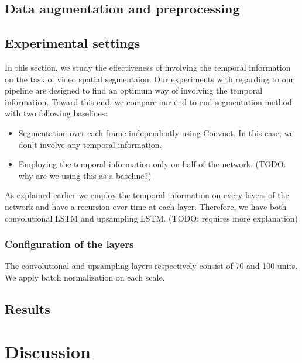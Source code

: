 \subsection{Data augmentation and preprocessing}

\subsection{Experimental settings}\label{sec:deconvLSTM_settings}
In this section, we study the effectiveness of involving the temporal
information on the task of video spatial segmentaion. Our experiments with
regarding to our pipeline are designed to find an optimum way of involving the
temporal information.
Toward this end, we compare our end to end segmentation method with two
following baselines:
\begin{itemize}
    \item Segmentation over each frame independently using Convnet. In this
        case, we don't involve any temporal information.
    \item Employing the temporal information only on half of the network. (TODO:
        why are we using this as a baseline?)
\end{itemize}
As explained earlier we employ the temporal information on every layers of the
network and have a recursion over time at each layer. Therefore, we have both
convolutional LSTM and upsampling LSTM. (TODO: requires more explanation)
\subsubsection{Configuration of the layers}
The convolutional and upsampling layers respectively consist of 70 and 100
units. We apply batch normalization on each scale.

\subsection{Results}\label{sec:deconvLSTM_results}




\section{Discussion}\label{sec:deconvLSTM_conclusions}
